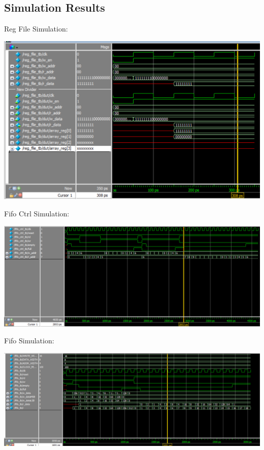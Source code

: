 \documentclass[12pt]{article}
\newenvironment{subquestion}[1]{\subsection{#1}
\begin{tcolorbox}[colback=blue!2!white,colframe=blue!20!white]}{\end{tcolorbox}}
\begin{document}
        \begin{subquestion}{Simulation Results}
            Reg File Simulation:
            \begin{center}
                \includegraphics[scale=0.5]{Images/reg file simulation.png}
            \end{center}

            Fifo Ctrl Simulation:
            \begin{center}
                \includegraphics[scale=0.5]{Images/fifo ctrl simulation.png}
            \end{center}

            Fifo Simulation:
            \begin{center}
                \includegraphics[scale=0.5]{Images/fifo simulation.png}
            \end{center}
        \end{subquestion}
\end{document}

